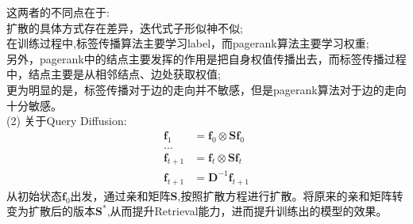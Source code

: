 \documentclass[answers]{exam}  %
\begin{document}
\begin{questions}
\begin{solution}
\begin{parts}
		这两者的不同点在于:\\
		扩散的具体方式存在差异，迭代式子形似神不似;\\
		在训练过程中,标签传播算法主要学习label，而pagerank算法主要学习权重;\\
		另外，pagerank中的结点主要发挥的作用是把自身权值传播出去，而标签传播过程中，结点主要是从相邻结点、边处获取权值;\\
		更为明显的是，标签传播对于边的走向并不敏感，但是pagerank算法对于边的走向十分敏感。\\
		(2)
		关于Query Diffusion:
		\begin{align*}
			\bm{f}_1  &= \bm{f}_0 \otimes \bm{S} \bm{f}_0 \\
			...\\
			\bm{f}_{t+1} &= \bm{f}_t \otimes \bm{S} \bm{f}_t \\
			\bm{f}_{t+1} &= \bm{D}^{-1} \bm{f}_{t+1}
		\end{align*}
		从初始状态$\bm{f}_0$出发，通过亲和矩阵$\bm{S}$,按照扩散方程进行扩散。将原来的亲和矩阵转变为扩散后的版本$\bm{S}^*$,从而提升Retrieval能力，进而提升训练出的模型的效果。\\

\end{parts}
\end{solution}
\end{questions}
\end{document}
